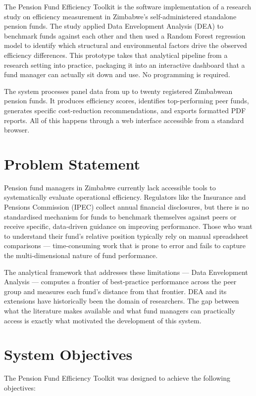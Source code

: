 \documentclass[12pt,a4paper]{report}
\begin{document}
The Pension Fund Efficiency Toolkit is the software implementation of a research study on
efficiency measurement in Zimbabwe's self-administered standalone pension funds. The study
applied Data Envelopment Analysis (DEA) to benchmark funds against each other and then
used a Random Forest regression model to identify which structural and environmental factors
drive the observed efficiency differences. This prototype takes that analytical pipeline from
a research setting into practice, packaging it into an interactive dashboard that a fund
manager can actually sit down and use. No programming is required.

The system processes panel data from up to twenty registered Zimbabwean pension funds.
It produces efficiency scores, identifies top-performing peer funds, generates specific
cost-reduction recommendations, and exports formatted PDF reports. All of this happens
through a web interface accessible from a standard browser.

\section{Problem Statement}

Pension fund managers in Zimbabwe currently lack accessible tools to systematically
evaluate operational efficiency. Regulators like the Insurance and Pensions Commission
(IPEC) collect annual financial disclosures, but there is no standardised mechanism for
funds to benchmark themselves against peers or receive specific, data-driven guidance on
improving performance. Those who want to understand their fund's relative position typically
rely on manual spreadsheet comparisons --- time-consuming work that is prone to error and
fails to capture the multi-dimensional nature of fund performance.

The analytical framework that addresses these limitations --- Data Envelopment Analysis ---
computes a frontier of best-practice performance across the peer group and measures each
fund's distance from that frontier. DEA and its extensions have historically been the domain
of researchers. The gap between what the literature makes available and what fund managers
can practically access is exactly what motivated the development of this system.

\section{System Objectives}

The Pension Fund Efficiency Toolkit was designed to achieve the following objectives:
\end{document}
